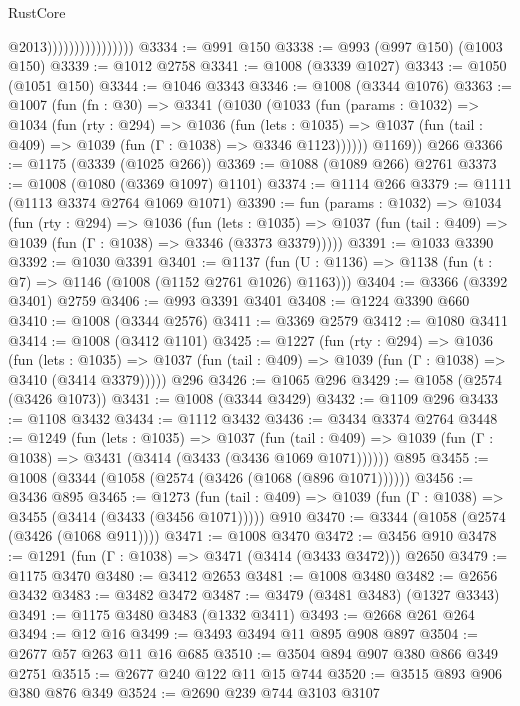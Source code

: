 \begin{lexlean}{RustCore}
\begin{coremodule}
                                    @2013))))))))))))))))
@3334 := @991 @150
@3338 := @993 (@997 @150) (@1003 @150)
@3339 := @1012 @2758
@3341 := @1008 (@3339 @1027)
@3343 := @1050 (@1051 @150)
@3344 := @1046 @3343
@3346 := @1008 (@3344 @1076)
@3363 := @1007
    (fun (fn : @30) =>
    @3341
      (@1030
        (@1033
          (fun (params : @1032) =>
          @1034
            (fun (rty : @294) =>
            @1036
              (fun (lets : @1035) =>
              @1037 (fun (tail : @409) => @1039 (fun (Γ : @1038) => @3346 @1123))))))
        @1169))
    @266
@3366 := @1175 (@3339 (@1025 @266))
@3369 := @1088 (@1089 @266) @2761
@3373 := @1008 (@1080 (@3369 @1097) @1101)
@3374 := @1114 @266
@3379 := @1111 (@1113 @3374 @2764 @1069 @1071)
@3390 := fun (params : @1032) =>
  @1034
    (fun (rty : @294) =>
    @1036
      (fun (lets : @1035) =>
      @1037 (fun (tail : @409) => @1039 (fun (Γ : @1038) => @3346 (@3373 @3379)))))
@3391 := @1033 @3390
@3392 := @1030 @3391
@3401 := @1137 (fun (U : @1136) => @1138 (fun (t : @7) => @1146 (@1008 (@1152 @2761 @1026) @1163)))
@3404 := @3366 (@3392 @3401) @2759
@3406 := @993 @3391 @3401
@3408 := @1224 @3390 @660
@3410 := @1008 (@3344 @2576)
@3411 := @3369 @2579
@3412 := @1080 @3411
@3414 := @1008 (@3412 @1101)
@3425 := @1227
    (fun (rty : @294) =>
    @1036
      (fun (lets : @1035) =>
      @1037 (fun (tail : @409) => @1039 (fun (Γ : @1038) => @3410 (@3414 @3379)))))
    @296
@3426 := @1065 @296
@3429 := @1058 (@2574 (@3426 @1073))
@3431 := @1008 (@3344 @3429)
@3432 := @1109 @296
@3433 := @1108 @3432
@3434 := @1112 @3432
@3436 := @3434 @3374 @2764
@3448 := @1249
    (fun (lets : @1035) =>
    @1037
      (fun (tail : @409) => @1039 (fun (Γ : @1038) => @3431 (@3414 (@3433 (@3436 @1069 @1071))))))
    @895
@3455 := @1008 (@3344 (@1058 (@2574 (@3426 (@1068 (@896 @1071))))))
@3456 := @3436 @895
@3465 := @1273
    (fun (tail : @409) => @1039 (fun (Γ : @1038) => @3455 (@3414 (@3433 (@3456 @1071)))))
    @910
@3470 := @3344 (@1058 (@2574 (@3426 (@1068 @911))))
@3471 := @1008 @3470
@3472 := @3456 @910
@3478 := @1291 (fun (Γ : @1038) => @3471 (@3414 (@3433 @3472))) @2650
@3479 := @1175 @3470
@3480 := @3412 @2653
@3481 := @1008 @3480
@3482 := @2656 @3432
@3483 := @3482 @3472
@3487 := @3479 (@3481 @3483) (@1327 @3343)
@3491 := @1175 @3480 @3483 (@1332 @3411)
@3493 := @2668 @261 @264
@3494 := @12 @16
@3499 := @3493 @3494 @11 @895 @908 @897
@3504 := @2677 @57 @263 @11 @16 @685
@3510 := @3504 @894 @907 @380 @866 @349 @2751
@3515 := @2677 @240 @122 @11 @15 @744
@3520 := @3515 @893 @906 @380 @876 @349
@3524 := @2690 @239 @744 @3103 @3107

\end{coremodule}
\end{lexlean}
